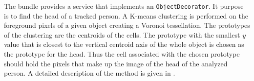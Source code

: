 
The bundle provides a service that implements an \texttt{ObjectDecorator}. It purpose is to find the head of a tracked person. A K-means clustering is performed on the foreground pixels of a given object creating a Voronoi tessellation. The prototypes of the clustering are the centroids of the cells. The prototype with the smallest $y$ value that is closest to the vertical centroid axis of the whole object is chosen as the prototype for the head. Thus the cell associated with the chosen prototype should hold the pixels that make up the image of the head of the analyzed person. A detailed description of the method is given in \cite{6424707}.

\configproperties


